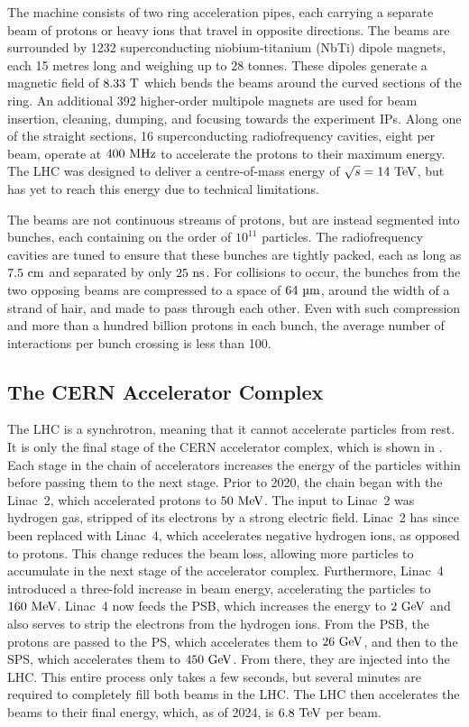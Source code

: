 The machine consists of two ring acceleration pipes, each carrying a separate beam of protons or heavy ions that travel in opposite directions.
The beams are surrounded by 1232 superconducting niobium-titanium (NbTi) dipole magnets, each 15 metres long and weighing up to 28 tonnes.
These dipoles generate a magnetic field of $8.33~\tesla$ which bends the beams around the curved sections of the ring.
An additional 392 higher-order multipole magnets are used for beam insertion, cleaning, dumping, and focusing towards the experiment \Gls{IPs}.
Along one of the straight sections, 16 superconducting radiofrequency cavities, eight per beam, operate at $400~\MHz$ to accelerate the protons to their maximum energy.
The \Gls{LHC} was designed to deliver a centre-of-mass energy of $\sqrt{s}=14~\TeV$, but has yet to reach this energy due to technical limitations.

The beams are not continuous streams of protons, but are instead segmented into bunches, each containing on the order of $10^{11}$ particles.
The radiofrequency cavities are tuned to ensure that these bunches are tightly packed, each as long as $7.5~\cm$ and separated by only $25~\ns$.
For collisions to occur, the bunches from the two opposing beams are compressed to a space of $64~\um$, around the width of a strand of hair, and made to pass through each other.
Even with such compression and more than a hundred billion protons in each bunch, the average number of interactions per bunch crossing \avemu is less than 100.

\subsection{The CERN Accelerator Complex}

The \Gls{LHC} is a synchrotron, meaning that it cannot accelerate particles from rest.
It is only the final stage of the \Gls{CERN} accelerator complex, which is shown in .
Each stage in the chain of accelerators increases the energy of the particles within before passing them to the next stage.
Prior to 2020, the chain began with the \Gls{Linac}~2, which accelerated protons to $50~\MeV$.
The input to \Gls{Linac}~2 was hydrogen gas, stripped of its electrons by a strong electric field.
\Gls{Linac}~2 has since been replaced with \Gls{Linac}~4, which accelerates negative hydrogen ions, as opposed to protons.
This change reduces the beam loss, allowing more particles to accumulate in the next stage of the accelerator complex.
Furthermore, \Gls{Linac}~4 introduced a three-fold increase in beam energy, accelerating the particles to $160~\MeV$.
\Gls{Linac}~4 now feeds the \Gls{PSB}, which increases the energy to $2~\GeV$ and also serves to strip the electrons from the hydrogen ions.
From the \Gls{PSB}, the protons are passed to the \Gls{PS}, which accelerates them to $26~\GeV$, and then to the \Gls{SPS}, which accelerates them to $450~\GeV$.
From there, they are injected into the \Gls{LHC}.
This entire process only takes a few seconds, but several minutes are required to completely fill both beams in the \Gls{LHC}.
The \Gls{LHC} then accelerates the beams to their final energy, which, as of 2024, is $6.8~\TeV$ per beam.

